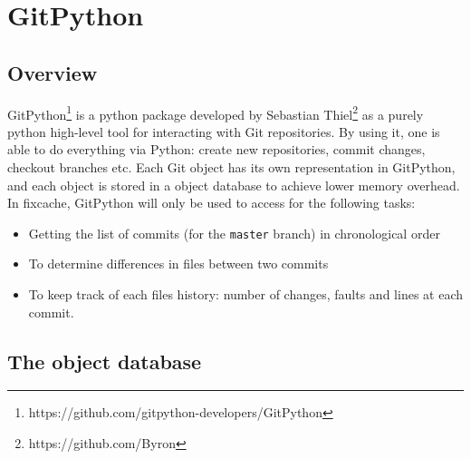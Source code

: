 \documentclass[12pt,twoside,notitlepage]{report}
\begin{document}
\section{GitPython}

\subsection{Overview}
GitPython\footnote{https://github.com/gitpython-developers/GitPython} is a python package developed by Sebastian Thiel\footnote{https://github.com/Byron} as a purely python high-level tool for interacting with Git repositories. By using it, one is able to do everything via Python: create new repositories, commit changes, checkout branches etc. Each Git object has its own representation in GitPython, and each object is stored in a object database to achieve lower memory overhead. In fixcache, GitPython will only be used to access for the following tasks:
\begin{itemize}
\item Getting the list of commits (for the \texttt{master} branch) in chronological order
\item To determine differences in files between two commits
\item To keep track of each files history: number of changes, faults and lines at each commit.
\end{itemize}
\subsection{The object database}\label{dbbackend}
\end{document}

